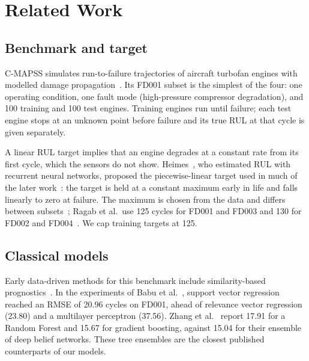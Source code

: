 \section{Related Work}
\label{sec:related}

\subsection{Benchmark and target}
C-MAPSS simulates run-to-failure trajectories of aircraft turbofan engines
with modelled damage propagation~\cite{saxena2008damage}. Its FD001
subset is the simplest of the four: one operating condition, one fault mode
(high-pressure compressor degradation), and 100 training and 100 test
engines. Training engines run until failure; each test engine stops at an
unknown point before failure and its true RUL at that cycle is given
separately.

A linear RUL target implies that an engine degrades at a constant rate from
its first cycle, which the sensors do not show. Heimes~\cite{heimes2008rnn},
who estimated RUL with recurrent neural networks, proposed the
piecewise-linear target used in much of the later
work~\cite{babu2016cnn,ragab2020attention}: the target is held at a
constant maximum early in life and falls linearly to zero at failure. The
maximum is chosen from the data and differs between
subsets~\cite{babu2016cnn}; Ragab et al.\ use 125 cycles for FD001 and
FD003 and 130 for FD002 and FD004~\cite{ragab2020attention}. We cap
training targets at 125.

\subsection{Classical models}
Early data-driven methods for this benchmark include similarity-based
prognostics~\cite{wang2008similarity}. In the experiments of Babu et
al.~\cite{babu2016cnn}, support vector regression reached an RMSE of 20.96
cycles on FD001, ahead of relevance vector regression (23.80) and a
multilayer perceptron (37.56). Zhang et al.~\cite{zhang2017modbne} report
17.91 for a Random Forest and 15.67 for gradient boosting, against 15.04
for their ensemble of deep belief networks. These tree ensembles are the
closest published counterparts of our models.

